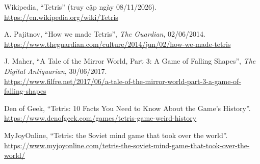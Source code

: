 
 Wikipedia, ``Tetris'' (truy cập ngày 08/11/2026).
\\\url{https://en.wikipedia.org/wiki/Tetris} 

 A. Pajitnov, ``How we made Tetris'', \textit{The Guardian}, 02/06/2014.\\ \url{https://www.theguardian.com/culture/2014/jun/02/how-we-made-tetris}

 J. Maher, ``A Tale of the Mirror World, Part 3: A Game of Falling Shapes'', \textit{The Digital Antiquarian}, 30/06/2017.\\
\url{https://www.filfre.net/2017/06/a-tale-of-the-mirror-world-part-3-a-game-of-falling-shapes}

 Den of Geek, ``Tetris: 10 Facts You Need to Know About the Game's History''.\\ 
\url{https://www.denofgeek.com/games/tetris-game-weird-history}

 MyJoyOnline, ``Tetris: the Soviet mind game that took over the world''.\\ 
\url{https://www.myjoyonline.com/tetris-the-soviet-mind-game-that-took-over-the-world/}
